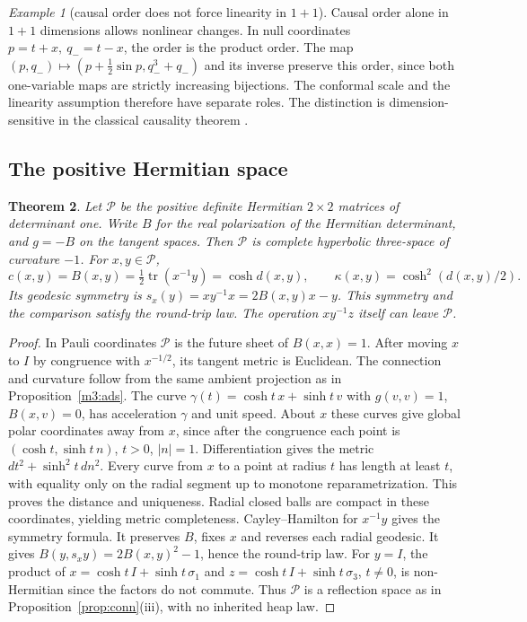 \documentclass[11pt,reqno]{amsart}
\newtheorem{theorem}{Theorem}[section]
\theoremstyle{definition}
\theoremstyle{remark}
\newtheorem{example}[theorem]{Example}
\numberwithin{equation}{section}
\begin{document}
\begin{example}[causal order does not force linearity in $1+1$]\label{m3:nonlinear}
Causal order alone in \(1+1\) dimensions allows nonlinear changes.
In null coordinates \(p=t+x,\ q_-=t-x\), the order is the product
order. The map \((p,q_-)\mapsto(p+\tfrac12\sin p,q_-^3+q_-)\)
and its inverse preserve this order, since both one-variable maps
are strictly increasing bijections. The conformal scale and the
linearity assumption therefore have separate roles. The distinction
is dimension-sensitive in the classical causality theorem
\cite[Theorem~1]{m3Zeeman}.
\end{example}

\subsection{The positive Hermitian space}\label{m3:hermitian-sub}

\begin{theorem}\label{m3:hyperboloid}
Let \(\mathcal P\) be the positive definite Hermitian \(2\times2\) matrices of
determinant one. Write \(B\) for the real polarization of the
Hermitian determinant, and \(g=-B\) on the tangent spaces. Then \(\mathcal P\)
is complete hyperbolic three-space of curvature \(-1\). For \(x,y\in\mathcal P\),
\[
 c(x,y)=B(x,y)=\tfrac12\operatorname{tr}(x^{-1}y)=\cosh d(x,y),
 \qquad \kappa(x,y)=\cosh^2(d(x,y)/2).
\]
Its geodesic symmetry is \(s_x(y)=xy^{-1}x=2B(x,y)x-y\).
This symmetry and the comparison satisfy the round-trip law.
The operation \(xy^{-1}z\) itself can leave \(\mathcal P\).
\end{theorem}
\begin{proof}
In Pauli coordinates \(\mathcal P\) is the future sheet of \(B(x,x)=1\).
After moving \(x\) to \(I\) by congruence with \(x^{-1/2}\), its
tangent metric is Euclidean. The connection and curvature follow from
the same ambient projection as in Proposition~\ref{m3:ads}.
The curve \(\gamma(t)=\cosh t\,x+\sinh t\,v\) with \(g(v,v)=1\),
\(B(x,v)=0\), has acceleration \(\gamma\) and unit speed. About \(x\)
these curves give global polar coordinates away from \(x\), since
after the congruence each point is \((\cosh t,\sinh t\,n)\),
\(t>0\), \(|n|=1\). Differentiation gives the metric
\(dt^2+\sinh^2t\,d n^2\). Every curve from \(x\) to a point
at radius \(t\) has length at least \(t\), with equality only on the
radial segment up to monotone reparametrization. This proves the
distance and uniqueness. Radial closed balls are compact in these
coordinates, yielding metric completeness. Cayley--Hamilton for
\(x^{-1}y\) gives the symmetry formula. It preserves \(B\), fixes \(x\)
and reverses each radial geodesic. It gives
\(B(y,s_xy)=2B(x,y)^2-1\), hence the round-trip law.
For \(y=I\), the product of \(x=\cosh t\,I+\sinh t\,\sigma_1\)
and \(z=\cosh t\,I+\sinh t\,\sigma_3\), \(t\ne0\), is non-Hermitian
since the factors do not commute. Thus \(\mathcal P\) is a reflection space
as in Proposition~\ref{prop:conn}(iii), with no inherited heap law.
\end{proof}
\end{document}
